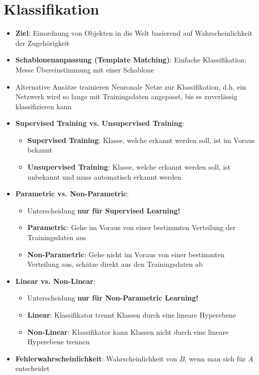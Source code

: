 \section{Klassifikation}%
\label{klass:sec:klassifikation}

\begin{itemize}
	\item \textbf{Ziel}: Einordnung von Objekten in die Welt basierend auf Wahrscheinlichkeit der Zugehörigkeit
	\item \textbf{Schablonenanpassung (Template Matching)}: Einfache Klassifikation; Messe Übereinstimmung mit einer Schablone
	\item Alternative Ansätze trainieren Neuronale Netze zur Klassifikation, d.h. ein Netzwerk wird so lange mit Trainingsdaten angepasst, bis es zuverlässig klassifizieren kann
	\item \textbf{Supervised Training vs. Unsupervised Training}:
	\begin{itemize}
		\item \textbf{Supervised Training}: Klasse, welche erkannt werden soll, ist im Voraus bekannt
		\item \textbf{Unsupervised Training}: Klasse, welche erkannt werden soll, ist unbekannt und muss automatisch erkannt werden
	\end{itemize}
	\item \textbf{Parametric vs. Non-Parametric}:
	\begin{itemize}
		\item Unterscheidung \textbf{nur für Supervised Learning!}
		\item \textbf{Parametric}: Gehe im Voraus von einer bestimmten Verteilung der Trainingsdaten aus
		\item \textbf{Non-Parametric}: Gehe nicht im Voraus von einer bestimmten Verteilung aus, schätze direkt aus den Trainingsdaten ab
	\end{itemize}
	\item \textbf{Linear vs. Non-Linear}:
	\begin{itemize}
		\item Unterscheidung \textbf{nur für Non-Parametric Learning!}
		\item \textbf{Linear}: Klassifikator trennt Klassen durch eine lineare Hyperebene
		\item \textbf{Non-Linear}: Klassifikator kann Klassen nicht durch eine lineare Hyperebene trennen
	\end{itemize}
	\item \textbf{Fehlerwahrscheinlichkeit}: Wahrscheinlichkeit von $B$, wenn man sich für $A$ entscheidet

\end{itemize}
